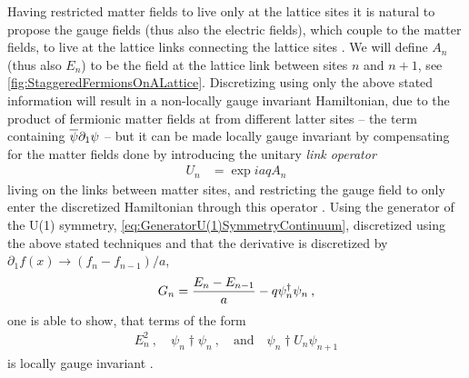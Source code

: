 \documentclass[../main.tex]{subfiles} %
\begin{document}
Having restricted matter fields to live only at the lattice sites it is natural to propose the gauge fields (thus also the electric fields), which couple to the matter fields, to live at the lattice links connecting the lattice sites \cite{melnikov_latticeSchwingerModel_2000}. We will define $A_n$ (thus also $E_n$) to be the field at the lattice link between sites $n$ and $n + 1$, see \cref{fig:StaggeredFermionsOnALattice}. Discretizing using only the above stated information will result in a non-locally gauge invariant Hamiltonian, due to the product of fermionic matter fields at from different latter sites -- the term containing $\overline{\psi}\partial_1\psi$ -- but it can be made locally gauge invariant by compensating for the matter fields done by introducing the unitary \emph{link operator}
\begin{align}
    U_n &= \exp{iaqA_n}
\end{align}
living on the links between matter sites, and restricting the gauge field to only enter the discretized Hamiltonian through this operator \cite{banksSusskindKogut_StrongCoupling_1976}. Using the generator of the U(1) symmetry, \cref{eq:GeneratorU(1)SymmetryContinuum}, discretized using the above stated techniques and that the derivative is discretized by $\partial_1 f(x) \rightarrow (f_n - f_{n - 1}) / a$,
\begin{align} \label{eq:GeneratorU(1)SymmetryDiscretized} \index{generator!of U(1) symmetry!discretized}\index{generator!of U(1) symmetry}
    G_n = \frac{E_n - E_{n-1}}{a} - q \psi_n\dagger \psi_n \: ,
\end{align}
one is able to show, that terms of the form
\begin{align} \label{eq:LatticeGaugeTheory_LocallyGaugeInvariantTerms}
    E_n^2 \: , \quad \psi_n\dagger \psi_n \: , \quad \text{and} \quad \psi_n\dagger U_n \psi_{n+1}
\end{align}
is locally gauge invariant \cite{banksSusskindKogut_StrongCoupling_1976, panyella_masterThesis_2019}.
\end{document}
